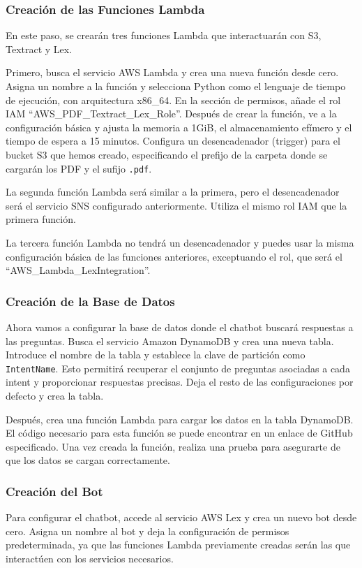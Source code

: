 \subsubsection{Creación de las Funciones Lambda}
En este paso, se crearán tres funciones Lambda que interactuarán con S3, Textract y Lex.

Primero, busca el servicio AWS Lambda y crea una nueva función desde cero. Asigna un nombre a la función y selecciona Python como el lenguaje de tiempo de ejecución, con arquitectura x86\_64. En la sección de permisos, añade el rol IAM “AWS\_PDF\_Textract\_Lex\_Role”. Después de crear la función, ve a la configuración básica y ajusta la memoria a 1GiB, el almacenamiento efímero y el tiempo de espera a 15 minutos. Configura un desencadenador (trigger) para el bucket S3 que hemos creado, especificando el prefijo de la carpeta donde se cargarán los PDF y el sufijo \texttt{.pdf}.

La segunda función Lambda será similar a la primera, pero el desencadenador será el servicio SNS configurado anteriormente. Utiliza el mismo rol IAM que la primera función.

La tercera función Lambda no tendrá un desencadenador y puedes usar la misma configuración básica de las funciones anteriores, exceptuando el rol, que será el “AWS\_Lambda\_LexIntegration”.

\subsubsection{Creación de la Base de Datos}
Ahora vamos a configurar la base de datos donde el chatbot buscará respuestas a las preguntas. Busca el servicio Amazon DynamoDB y crea una nueva tabla. Introduce el nombre de la tabla y establece la clave de partición como \texttt{IntentName}. Esto permitirá recuperar el conjunto de preguntas asociadas a cada intent y proporcionar respuestas precisas. Deja el resto de las configuraciones por defecto y crea la tabla.

Después, crea una función Lambda para cargar los datos en la tabla DynamoDB. El código necesario para esta función se puede encontrar en un enlace de GitHub especificado. Una vez creada la función, realiza una prueba para asegurarte de que los datos se cargan correctamente.

\subsubsection{Creación del Bot}
Para configurar el chatbot, accede al servicio AWS Lex y crea un nuevo bot desde cero. Asigna un nombre al bot y deja la configuración de permisos predeterminada, ya que las funciones Lambda previamente creadas serán las que interactúen con los servicios necesarios.

